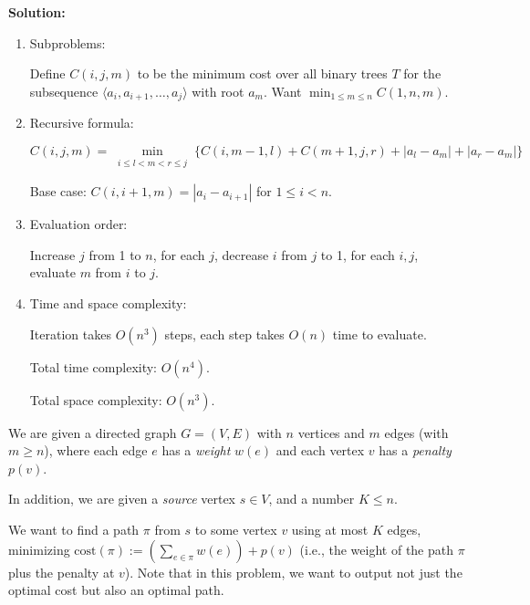 \documentclass[11pt]{article}
\begin{document}
\begin{description}

\newpage
\textbf{Solution:}
\begin{enumerate}
  \item[(i)] Subproblems:

  Define $C(i,j,m)$ to be the minimum cost over all binary trees $T$ for
  the subsequence $\langle a_i,a_{i+1},\ldots,a_j\rangle$ with root $a_m$.
  Want $\min_{1 \le m \le n}C(1, n, m)$.

  \item[(ii)] Recursive formula:
  
  \[
    C(i, j, m) = \min_{\substack{i \le l < m < r \le j}}
    \{C(i, m-1, l) + C(m+1, j, r) + |a_l - a_m| + |a_r - a_m|\}
  \]

  Base case: $C(i, i+1, m) = |a_i - a_{i+1}|$ for $1 \le i < n$.

  \item[(iii)] Evaluation order:
  
  Increase $j$ from 1 to $n$, for each $j$, decrease $i$ from $j$ to 1, for each $i, j$,
  evaluate $m$ from $i$ to $j$.

  \item[(iv)] Time and space complexity:
  
  Iteration takes $O(n^3)$ steps, each step takes $O(n)$ time to evaluate.

  Total time complexity: $O(n^4)$.

  Total space complexity: $O(n^3)$.

\end{enumerate}



\newpage
\item[Problem 3.3:]
We are given a directed graph $G=(V,E)$ with $n$ vertices and $m$ edges (with $m\ge n$),
where each edge $e$ has a \emph{weight} $w(e)$ and each vertex $v$ has a \emph{penalty} $p(v)$.

In addition, we are given a \emph{source} vertex $s\in V$,
and a number $K\le n$.

We want to find a path $\pi$ from $s$ to some vertex $v$
using at most $K$ edges, minimizing $\textrm{cost}(\pi) := \left(\sum_{e\in\pi} w(e)\right) + p(v)$
(i.e., the weight of the path $\pi$ plus the penalty at $v$).
Note that in this problem, we want to output not just the optimal cost but also an optimal path.
 

\end{description}
\end{document}
